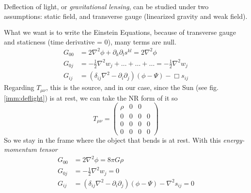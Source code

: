  \par
\bigskip
Deflection of light, or \emph{gravitational lensing}, can be studied under two assumptions: static field, and transverse gauge (linearized gravity and weak field).\par
What we want is to write the Einstein Equations, because of transverse gauge and staticness (time derivative = 0), many terms are null.
\begin{align}
	G_{00}& = 2\nabla ^{2}\phi  + \partial_{k}\partial_{l}s^{kl} = 2\nabla ^{2}\phi \\
	G_{0j}& = -\frac{1}{2}\nabla ^{2}w_{j}+ \ldots +\ldots +\ldots  = -\frac{1}{2}\nabla ^{2}w_{j} \\
G_{ij} & = \left( \delta _{ij}\nabla ^{2}-\partial_{i}\partial_{j} \right)\left( \phi -\Psi  \right)- \Box s_{ij} 
\end{align}
Regarding $T_{\mu \nu }$, this is the source, and in our case, since the Sun (see fig. \ref{imm:deflight}) is at rest, we can take the NR form of it so
\[
T_{\mu \nu } = \begin{pmatrix}
\rho  & 0 & 0 \\
0 & 0 & 0 & 0 \\
0 & 0 & 0 & 0 \\
0 & 0 & 0 & 0
\end{pmatrix} 
\]
So we stay in the frame where the object that bends is at rest. With this \emph{energy-momentum tensor} 
\begin{align}
	G_{00} &= 2\nabla ^{2}\phi = 8\pi G \rho \\
	G_{0j} &= -\frac{1}{2}\nabla ^{2}w_{j} = 0 \\
	G_{ij} &= \left( \delta _{ij}\nabla ^{2}- \partial_{i}\partial_{j} \right)\left( \phi -\Psi  \right)- \nabla ^{2}s_{ij} = 0
\end{align}
